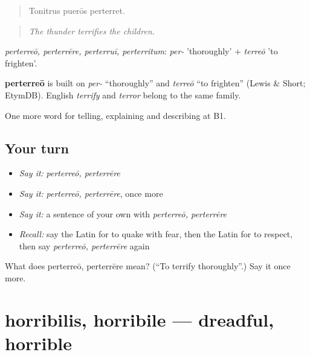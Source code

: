 \begin{quote}
Tonitrus puerōs perterret.
\end{quote}

\begin{quote}
\emph{The thunder terrifies the children.}
\end{quote}

\emph{perterreō, perterrēre, perterruī, perterritum}: \emph{per-} 'thoroughly' + \emph{terreō} 'to frighten'.

\begin{cousinweb}
\textbf{perterreō} is built on \emph{per-} \textquotedblleft{}thoroughly\textquotedblright{} and \emph{terreō} \textquotedblleft{}to frighten\textquotedblright{} (Lewis \& Short; EtymDB). English \emph{terrify} and \emph{terror} belong to the same family.
\end{cousinweb}

\begin{grammarlens}[title={What you've built}]
One more word for telling, explaining and describing at B1.
\end{grammarlens}

\subsection*{Your turn}
\begin{itemize}
\raggedright
  \item \emph{Say it:} \emph{perterreō, perterrēre}
  \item \emph{Say it:} \emph{perterreō, perterrēre}, once more
  \item \emph{Say it:} a sentence of your own with \emph{perterreō, perterrēre}
  \item \emph{Recall:} say the Latin for to quake with fear, then the Latin for to respect, then say \emph{perterreō, perterrēre} again
\end{itemize}

\begin{tcolorbox}[breakable,colback=teal!4,colframe=teal!35!black,title={Before you move on}]
What does perterreō, perterrēre mean? (\textquotedblleft{}To terrify thoroughly\textquotedblright{}.) Say it once more.
\end{tcolorbox}
\section[horribilis, horribile]{horribilis, horribile — dreadful, horrible}

\label{lesson:LA-C496-horribilis}



